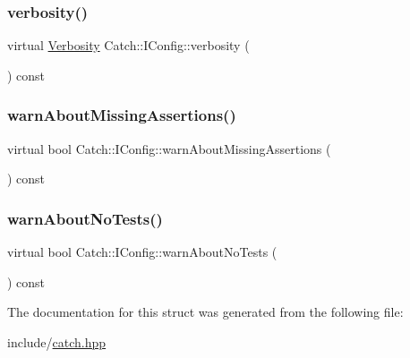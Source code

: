 \mbox{\label{struct_catch_1_1_i_config_a55aff5924bdbb3f558775821b1eb4b3d}} 
\subsubsection{\texorpdfstring{verbosity()}{verbosity()}}
{\footnotesize\ttfamily virtual \mbox{\hyperlink{namespace_catch_af85c0d46dfe687d923a157362fd07737}{Verbosity}} Catch\+::\+I\+Config\+::verbosity (\begin{DoxyParamCaption}{ }\end{DoxyParamCaption}) const\hspace{0.3cm}{\ttfamily [pure virtual]}}

\mbox{\label{struct_catch_1_1_i_config_a75d970c495a28e46b8e9b04a1d32149f}} 
\subsubsection{\texorpdfstring{warnAboutMissingAssertions()}{warnAboutMissingAssertions()}}
{\footnotesize\ttfamily virtual bool Catch\+::\+I\+Config\+::warn\+About\+Missing\+Assertions (\begin{DoxyParamCaption}{ }\end{DoxyParamCaption}) const\hspace{0.3cm}{\ttfamily [pure virtual]}}

\mbox{\label{struct_catch_1_1_i_config_a30590623e3918825f2896c2262bf6fe3}} 
\subsubsection{\texorpdfstring{warnAboutNoTests()}{warnAboutNoTests()}}
{\footnotesize\ttfamily virtual bool Catch\+::\+I\+Config\+::warn\+About\+No\+Tests (\begin{DoxyParamCaption}{ }\end{DoxyParamCaption}) const\hspace{0.3cm}{\ttfamily [pure virtual]}}



The documentation for this struct was generated from the following file\+:\begin{DoxyCompactItemize}
\item 
include/\mbox{\hyperlink{catch_8hpp}{catch.\+hpp}}\end{DoxyCompactItemize}
